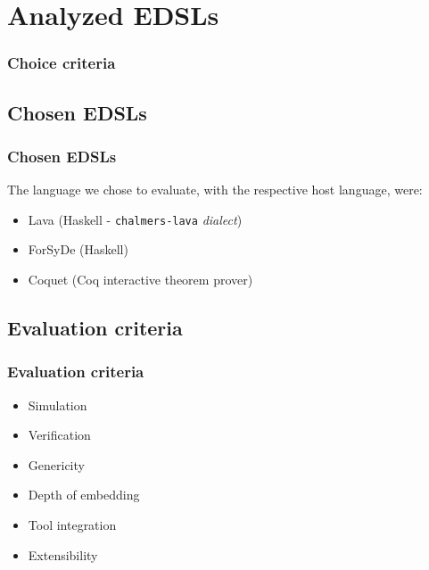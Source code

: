 \section{Analyzed EDSLs}
\label{sec:analyzed-edsls}
    \frame{\sectionpage}

    \begin{frame}
        \frametitle{Choice criteria}
    \end{frame}


    \subsection{Chosen EDSLs}
    \label{subsec:chosen-edsls}
        \begin{frame}
            \frametitle{Chosen EDSLs}
            The language we chose to evaluate, with the respective host language, were:

            \begin{itemize}
                \item Lava (Haskell - \texttt{chalmers-lava} \emph{dialect})
                \item ForSyDe (Haskell)
                \item Coquet (Coq interactive theorem prover)
            \end{itemize}
        \end{frame}

    \subsection{Evaluation criteria}
    \label{subsec:evaluation-criteria}
        \begin{frame}
            \frametitle{Evaluation criteria}

            \begin{itemize}
                \item Simulation
                \item Verification
                \item Genericity
                \item Depth of embedding
                \item Tool integration
                \item Extensibility
            \end{itemize}
        \end{frame}
